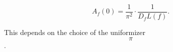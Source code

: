 $$A_f(0) = \frac{1}{\pi^2} \cdot \frac{1}{D_f L(f)}.$$

This depends on the choice of the uniformizer $$\pi$$.
